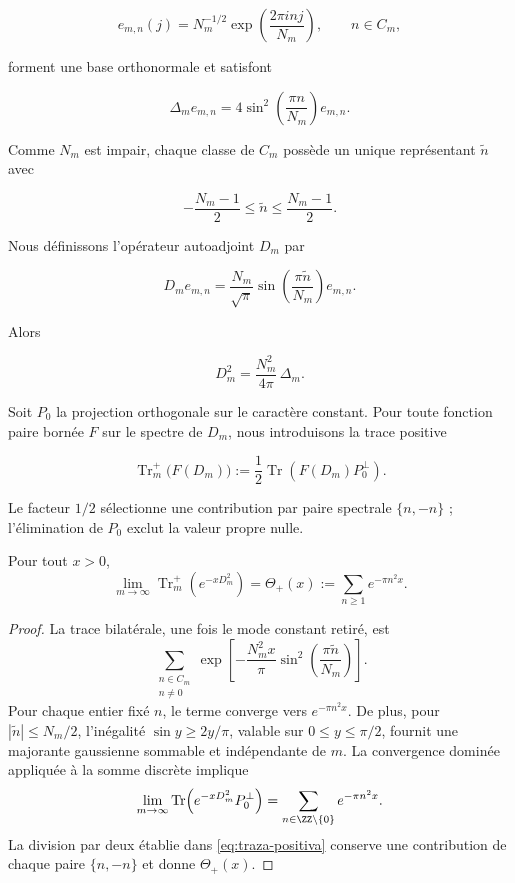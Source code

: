 \[
 e_{m,n}(j)=N_m^{-1/2}
 \exp\!\left(\frac{2\pi i n j}{N_m}\right),
 \qquad n\in C_m,
\]

forment une base orthonormale et satisfont

\[
 \Delta_m e_{m,n}
 =4\sin^2\!\left(\frac{\pi n}{N_m}\right)e_{m,n}.
\]

Comme $N_m$ est impair, chaque classe de $C_m$ possède un unique représentant
$\widetilde n$ avec

\[
 -\frac{N_m-1}{2}\leq\widetilde n\leq\frac{N_m-1}{2}.
\]

Nous définissons l'opérateur autoadjoint $D_m$ par

\begin{equation}
 D_m e_{m,n}
 =\frac{N_m}{\sqrt\pi}
 \sin\!\left(\frac{\pi\widetilde n}{N_m}\right)e_{m,n}.
 \label{eq:operador-espectral-Dm}
\end{equation}

Alors

\begin{equation}
 D_m^2=\frac{N_m^2}{4\pi}\,\Delta_m.
 \label{eq:Dm-laplaciano}
\end{equation}

Soit $P_0$ la projection orthogonale sur le caractère constant. Pour toute
fonction paire bornée $F$ sur le spectre de $D_m$, nous introduisons la trace
positive

\begin{equation}
 \operatorname{Tr}^{+}_m\!\bigl(F(D_m)\bigr)
 :=\frac12\operatorname{Tr}
 \!\left(F(D_m)P_0^{\perp}\right).
 \label{eq:traza-positiva}
\end{equation}

Le facteur $1/2$ sélectionne une contribution par paire spectrale
$\{n,-n\}$ ; l'élimination de $P_0$ exclut la valeur propre nulle.

\begin{theorem}
\label{thm:limite-theta-triadico}
Pour tout $x>0$,
\[
 \lim_{m\to\infty}
 \operatorname{Tr}^{+}_m\!\left(e^{-xD_m^2}\right)
 =\Theta_+(x)
 :=\sum_{n\geq1}e^{-\pi n^2x}.
\]
\end{theorem}

\begin{proof}
La trace bilatérale, une fois le mode constant retiré, est
\[
 \sum_{\substack{n\in C_m\\n\neq0}}
 \exp\!\left[
 -\frac{N_m^2x}{\pi}
 \sin^2\!\left(\frac{\pi\widetilde n}{N_m}\right)
 \right].
\]
Pour chaque entier fixé $n$, le terme converge vers $e^{-\pi n^2x}$. De plus,
pour $|\widetilde n|\leq N_m/2$, l'inégalité
$\sin y\geq 2y/\pi$, valable sur $0\leq y\leq\pi/2$, fournit une
majorante gaussienne sommable et indépendante de $m$. La convergence
dominée appliquée à la somme discrète implique
\[
 \lim_{m\to\infty}
 \operatorname{Tr}\!\left(e^{-xD_m^2}P_0^\perp\right)
 =\sum_{n\in\ZZ\setminus\{0\}}e^{-\pi n^2x}.
\]
La division par deux établie dans \eqref{eq:traza-positiva} conserve une
contribution de chaque paire $\{n,-n\}$ et donne $\Theta_+(x)$.
\end{proof}

